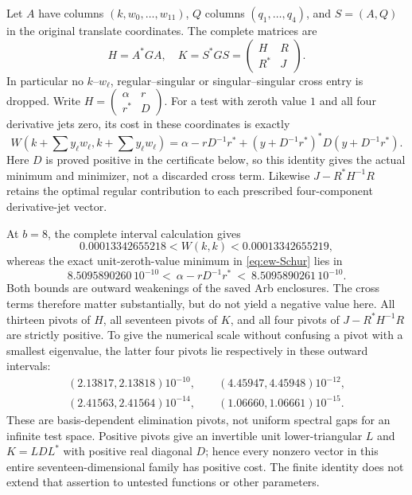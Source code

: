 Let $A$ have columns $(k,w_0,\ldots,w_{11})$, $Q$ columns
$(q_1,\ldots,q_4)$, and $S=(A,Q)$ in the original translate
coordinates. The complete matrices are
\[
 H=A^*GA,\quad K=S^*GS=
 \begin{pmatrix}H&R\\R^*&J\end{pmatrix}.
\]
In particular no $k$--$w_\ell$, regular--singular or singular--singular
cross entry is dropped. Write
$H=\left(\begin{smallmatrix}\alpha&r\\r^*&D\end{smallmatrix}\right)$.
For a test with zeroth value $1$ and all four derivative jets zero,
its cost in these coordinates is exactly
\begin{equation}
 W(k+\textstyle\sum y_\ell w_\ell,
   k+\textstyle\sum y_\ell w_\ell)
 =\alpha-rD^{-1}r^*+
       (y+D^{-1}r^*)^*D(y+D^{-1}r^*).
 \label{eq:ew-Schur}
\end{equation}
Here $D$ is proved positive in the certificate below, so this identity
gives the actual minimum and minimizer, not a discarded cross term.
Likewise $J-R^*H^{-1}R$ retains the optimal regular contribution to
each prescribed four-component derivative-jet vector.

At $b=8$, the complete interval calculation gives
\[
 0.00013342655218<W(k,k)<0.00013342655219,
\]
whereas the exact unit-zeroth-value minimum in
\eqref{eq:ew-Schur} lies in
\begin{equation}
 8.5095890260\,10^{-10} <\ \alpha-rD^{-1}r^*\ <\
                                      8.5095890261\,10^{-10}.
 \label{eq:ew-minimum}
\end{equation}
Both bounds are outward weakenings of the saved Arb enclosures.
The cross terms therefore matter substantially, but do not yield
a negative value here. All thirteen pivots of $H$, all seventeen
pivots of $K$, and all four pivots of $J-R^*H^{-1}R$ are strictly
positive. To give the numerical scale without confusing a pivot
with a smallest eigenvalue, the latter four pivots lie respectively
in these outward intervals:
\begin{gather*}
 (2.13817,2.13818)10^{-10},\qquad(4.45947,4.45948)10^{-12},\\
 (2.41563,2.41564)10^{-14},\qquad(1.06660,1.06661)10^{-15}.
\end{gather*}
These are basis-dependent elimination pivots, not uniform spectral
gaps for an infinite test space. Positive pivots give an invertible
unit lower-triangular $L$ and $K=LDL^*$ with positive real diagonal
$D$; hence every nonzero vector in this entire seventeen-dimensional
family has positive cost. The finite identity does not extend that
assertion to untested functions or other parameters.

